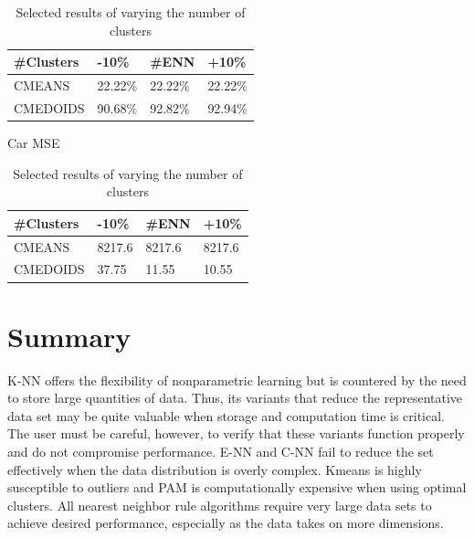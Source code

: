 \documentclass[twoside,11pt]{article}
\begin{document}
\begin{table}[h]
\begin{minipage}[b]{0.45\linewidth}
\begin{tabular}{llll}
			\hline
			\#Clusters & -10\% & \#ENN   & +10\% \\ \hline
			CMEANS     & 22.22\%      & 22.22\% & 22.22\%      \\
			CMEDOIDS   & 90.68\%      & 92.82\% & 92.94\%
		\end{tabular}
	\end{minipage}
	\hspace{0.5cm}
	\begin{minipage}[b]{0.45\linewidth}
		Car MSE
		\centering
		\begin{tabular}{llll}
			\hline
			\#Clusters & -10\% & \#ENN  & +10\% \\ \hline
			CMEANS     & 8217.6       & 8217.6 & 8217.6       \\
			CMEDOIDS   & 37.75        & 11.55  & 10.55
		\end{tabular}
	\end{minipage}
	\caption{Selected results of varying the number of clusters}
\end{table}


\section{Summary}

K-NN offers the flexibility of nonparametric learning but is countered by the need to store large quantities of data. Thus, its variants that reduce the representative data set may be quite valuable when storage and computation time is critical. The user must be careful, however, to verify that these variants function properly and do not compromise performance. E-NN and C-NN fail to reduce the set effectively when the data distribution is overly complex. Kmeans is highly susceptible to outliers and PAM is computationally expensive when using optimal clusters. All nearest neighbor rule algorithms require very large data sets to achieve desired performance, especially as the data takes on more dimensions.



\end{document}
